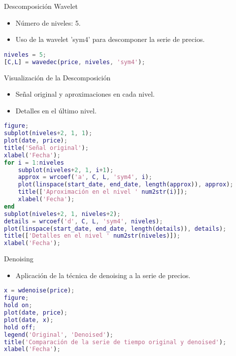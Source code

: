 \documentclass{beamer}
\begin{document}
\begin{frame}{Descomposición Wavelet}
\begin{itemize}
    \item Número de niveles: 5.
    \item Uso de la wavelet 'sym4' para descomponer la serie de precios.
\end{itemize}
\begin{lstlisting}[language=Matlab]
niveles = 5;
[C,L] = wavedec(price, niveles, 'sym4');
\end{lstlisting}
\end{frame}

\begin{frame}{Visualización de la Descomposición}
\begin{itemize}
    \item Señal original y aproximaciones en cada nivel.
    \item Detalles en el último nivel.
\end{itemize}
\begin{lstlisting}[language=Matlab]
figure;
subplot(niveles+2, 1, 1);
plot(date, price);
title('Señal original');
xlabel('Fecha');
for i = 1:niveles
    subplot(niveles+2, 1, i+1);
    approx = wrcoef('a', C, L, 'sym4', i);
    plot(linspace(start_date, end_date, length(approx)), approx);
    title(['Aproximación en el nivel ' num2str(i)]);
    xlabel('Fecha');
end
subplot(niveles+2, 1, niveles+2);
details = wrcoef('d', C, L, 'sym4', niveles);
plot(linspace(start_date, end_date, length(details)), details);
title(['Detalles en el nivel ' num2str(niveles)]);
xlabel('Fecha');
\end{lstlisting}
\end{frame}

\begin{frame}{Denoising}
\begin{itemize}
    \item Aplicación de la técnica de denoising a la serie de precios.
\end{itemize}
\begin{lstlisting}[language=Matlab]
x = wdenoise(price);
figure;
hold on;
plot(date, price);
plot(date, x);
hold off;
legend('Original', 'Denoised');
title('Comparación de la serie de tiempo original y denoised');
xlabel('Fecha');
\end{lstlisting}
\end{frame}
\end{document}
